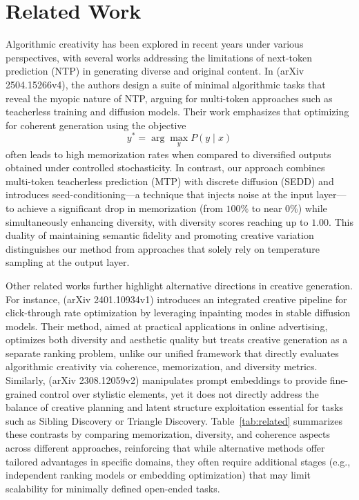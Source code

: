 \documentclass[11pt]{article}
\begin{document}
\section{Related Work}
Algorithmic creativity has been explored in recent years under various perspectives, with several works addressing the limitations of next-token prediction (NTP) in generating diverse and original content. In (arXiv 2504.15266v4), the authors design a suite of minimal algorithmic tasks that reveal the myopic nature of NTP, arguing for multi-token approaches such as teacherless training and diffusion models. Their work emphasizes that optimizing for coherent generation using the objective 
\[
y^* = \arg\max_{y} P(y \mid x)
\]
often leads to high memorization rates when compared to diversified outputs obtained under controlled stochasticity. In contrast, our approach combines multi-token teacherless prediction (MTP) with discrete diffusion (SEDD) and introduces seed-conditioning—a technique that injects noise at the input layer—to achieve a significant drop in memorization (from \(100\%\) to near \(0\%\)) while simultaneously enhancing diversity, with diversity scores reaching up to \(1.00\). This duality of maintaining semantic fidelity and promoting creative variation distinguishes our method from approaches that solely rely on temperature sampling at the output layer.

Other related works further highlight alternative directions in creative generation. For instance, (arXiv 2401.10934v1) introduces an integrated creative pipeline for click-through rate optimization by leveraging inpainting modes in stable diffusion models. Their method, aimed at practical applications in online advertising, optimizes both diversity and aesthetic quality but treats creative generation as a separate ranking problem, unlike our unified framework that directly evaluates algorithmic creativity via coherence, memorization, and diversity metrics. Similarly, (arXiv 2308.12059v2) manipulates prompt embeddings to provide fine-grained control over stylistic elements, yet it does not directly address the balance of creative planning and latent structure exploitation essential for tasks such as Sibling Discovery or Triangle Discovery. Table~\ref{tab:related} summarizes these contrasts by comparing memorization, diversity, and coherence aspects across different approaches, reinforcing that while alternative methods offer tailored advantages in specific domains, they often require additional stages (e.g., independent ranking models or embedding optimization) that may limit scalability for minimally defined open-ended tasks.
\end{document}
